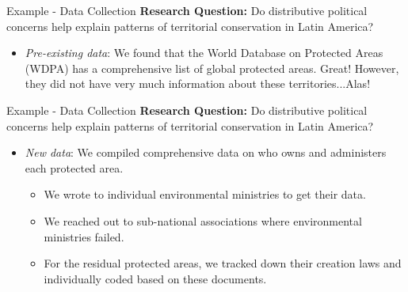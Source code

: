 \documentclass{beamer}
\begin{document}
\begin{frame}{Example - Data Collection}
\textbf{Research Question:} Do distributive political concerns help explain patterns of territorial conservation in Latin America? 
\begin{itemize} 
    \item \textit{Pre-existing data}: We found that the World Database on Protected Areas (WDPA) has a comprehensive list of global protected areas. Great! However, they did not have very much information about these territories...Alas! 
 \end{itemize}
\end{frame} 
\begin{frame}{Example - Data Collection}
\textbf{Research Question:} Do distributive political concerns help explain patterns of territorial conservation in Latin America? 
\begin{itemize} 
    \item \textit{New data}: We compiled comprehensive data on who owns and administers each protected area. 
    \begin{itemize}
        \item We wrote to individual environmental ministries to get their data. 
        \item We reached out to sub-national associations where environmental ministries failed.
        \item For the residual protected areas, we tracked down their creation laws and individually coded based on these documents. 
    \end{itemize}
\end{itemize}
\end{frame} 
\end{document}

